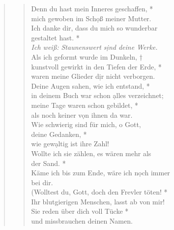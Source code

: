 \vspace{0.3cm}
\def\greinitialformat#1{{\fontsize{40}{40}\selectfont #1}}
\gresetfirstlineaboveinitial{\small \textcolor{red}{Ps 139b}}{}
\setaboveinitialseparation{0.72mm}


\vspace{0.3cm}


\begin{quote}
 



\begin{verse}
 Denn du hast mein Inneres geschaffen, *\\
mich gewoben im Sch\d oß meiner Mutter.\\ \vin 
Ich danke dir, dass du mich so wunderbar\\ \vin  gestaltet hast. *\\ \vin
\textit{Ich weiß: Staunenswert s\d ind deine Werke.}\\
Als ich geformt wurde im Dunkeln, †\\
kunstvoll gewirkt in den Tiefen der Erde, *\\ waren meine Glieder d\d ir nicht verborgen.\\ \vin 
Deine Augen sahen, wie ich entstand, *\\ \vin
in deinem Buch war schon \d alles verzeichnet; \\
meine Tage waren schon gebildet, *\\ als noch keiner v\d on ihnen da war.\\ \vin
Wie schwierig sind für mich, o Gott,\\ \vin  deine Gedanken, *\\ \vin
wie gew\d altig ist ihre Zahl! \\
Wollte ich sie zählen, es wären mehr als \\ der Sand. *\\
Käme ich bis zum Ende, wäre ich n\d och immer \\bei dir.\\ \vin
(Wolltest du, Gott, doch den Frevler töten! *\\ \vin
Ihr blutgierigen Menschen, lasst ab von mir! \\
Sie reden über dich voll Tücke *\\
und missbrauchen deinen Namen.\\ \vin

\end{verse}
\end{quote}
